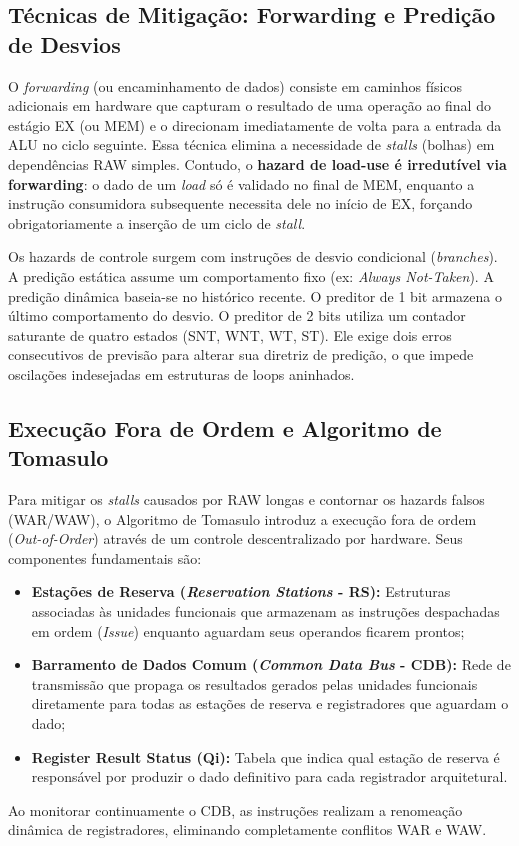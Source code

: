 \documentclass[12pt,a4paper]{article}
\begin{document}
\subsection{Técnicas de Mitigação: Forwarding e Predição de Desvios}
O \textit{forwarding} (ou encaminhamento de dados) consiste em caminhos físicos adicionais em hardware que capturam o resultado de uma operação ao final do estágio EX (ou MEM) e o direcionam imediatamente de volta para a entrada da ALU no ciclo seguinte. Essa técnica elimina a necessidade de \textit{stalls} (bolhas) em dependências RAW simples. Contudo, o \textbf{hazard de load-use é irredutível via forwarding}: o dado de um \textit{load} só é validado no final de MEM, enquanto a instrução consumidora subsequente necessita dele no início de EX, forçando obrigatoriamente a inserção de um ciclo de \textit{stall}.

Os hazards de controle surgem com instruções de desvio condicional (\textit{branches}). A predição estática assume um comportamento fixo (ex: \textit{Always Not-Taken}). A predição dinâmica baseia-se no histórico recente. O preditor de 1 bit armazena o último comportamento do desvio. O preditor de 2 bits utiliza um contador saturante de quatro estados (SNT, WNT, WT, ST). Ele exige dois erros consecutivos de previsão para alterar sua diretriz de predição, o que impede oscilações indesejadas em estruturas de loops aninhados.

\subsection{Execução Fora de Ordem e Algoritmo de Tomasulo}
Para mitigar os \textit{stalls} causados por RAW longas e contornar os hazards falsos (WAR/WAW), o Algoritmo de Tomasulo introduz a execução fora de ordem (\textit{Out-of-Order}) através de um controle descentralizado por hardware. Seus componentes fundamentais são:
\begin{itemize}
    \item \textbf{Estações de Reserva (\textit{Reservation Stations} - RS):} Estruturas associadas às unidades funcionais que armazenam as instruções despachadas em ordem (\textit{Issue}) enquanto aguardam seus operandos ficarem prontos;
    \item \textbf{Barramento de Dados Comum (\textit{Common Data Bus} - CDB):} Rede de transmissão que propaga os resultados gerados pelas unidades funcionais diretamente para todas as estações de reserva e registradores que aguardam o dado;
    \item \textbf{Register Result Status (Qi):} Tabela que indica qual estação de reserva é responsável por produzir o dado definitivo para cada registrador arquitetural.
\end{itemize}
Ao monitorar continuamente o CDB, as instruções realizam a renomeação dinâmica de registradores, eliminando completamente conflitos WAR e WAW.
\end{document}
